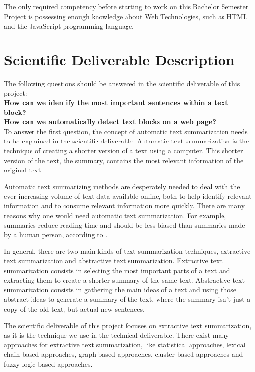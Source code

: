 \documentclass[conference,compsoc]{IEEEtran}
\begin{document}
The only required competency before starting to work on this Bachelor Semester Project is possessing enough knowledge about Web Technologies, such as HTML and the JavaScript programming language.


\section{Scientific Deliverable Description}

The following questions should be answered in the scientific deliverable of this project:\\

\textbf{How can we identify the most important sentences within a text block?}\\

\textbf{How can we automatically detect text blocks on a web page?}\\

To answer the first question, the concept of automatic text summarization needs to be explained in the scientific deliverable.
Automatic text summarization is the technique of creating a shorter version of a text using a computer. This shorter version of the text, the summary, contains the most relevant information of the original text.

Automatic text summarizing methods are desperately needed to deal with the ever-increasing volume of text data available online, both to help identify relevant information and to consume relevant information more quickly. There are many reasons why one would need automatic text summarization. For example, summaries reduce reading time and should be less biased than summaries made by a human person, according to \cite{torres2014automatic}.

In general, there are two main kinds of text summarization techniques, extractive text summarization and abstractive text summarization. Extractive text summarization consists in selecting the most important parts of a text and extracting them to create a shorter summary of the same text. Abstractive text summarization consists in gathering the main ideas of a text and using those abstract ideas to generate a summary of the text, where the summary isn't just a copy of the old text, but actual new sentences.

The scientific deliverable of this project focuses on extractive text summarization, as it is the technique we use in the technical deliverable. There exist many approaches for extractive text summarization, like statistical approaches, lexical chain based approaches, graph-based approaches, cluster-based approaches and fuzzy logic based approaches.
\end{document}
